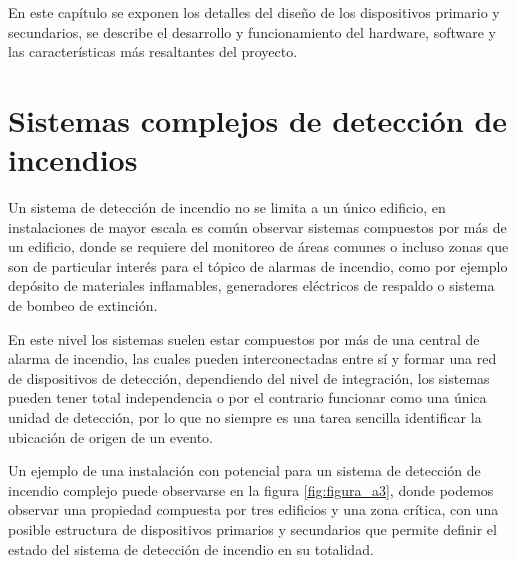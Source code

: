 
En este capítulo se exponen los detalles del diseño de los dispositivos primario y secundarios, se describe el desarrollo y funcionamiento del hardware, software y las características más resaltantes del proyecto.

\section{Sistemas complejos de detección de incendios}

Un sistema de detección de incendio no se limita a un único edificio, en instalaciones de mayor escala es común observar sistemas compuestos por más de un edificio, donde se requiere del monitoreo de áreas comunes o incluso zonas que son de particular interés para el tópico de alarmas de incendio, como por ejemplo depósito de materiales inflamables, generadores eléctricos de respaldo o sistema de bombeo de extinción.

En este nivel los sistemas suelen estar compuestos por más de una central de alarma de incendio, las cuales pueden interconectadas entre sí y formar una red de dispositivos de detección, dependiendo del nivel de integración, los sistemas pueden tener total independencia o por el contrario funcionar como una única unidad de detección, por lo que  no siempre es una tarea sencilla identificar la ubicación de origen de un evento.

Un ejemplo de una instalación con potencial para un sistema de detección de incendio complejo puede observarse en la figura \ref{fig:figura_a3}, donde podemos observar una propiedad compuesta por tres edificios y una zona crítica, con una posible estructura de dispositivos primarios y secundarios que permite definir el estado del sistema de detección de incendio en su totalidad.


